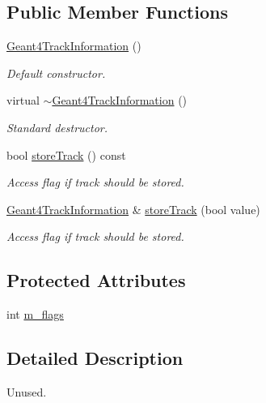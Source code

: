 \subsection*{Public Member Functions}
\begin{DoxyCompactItemize}
\item 
\hyperlink{class_d_d4hep_1_1_simulation_1_1_geant4_track_information_af654942e019813e21dd67c40cb964067}{Geant4\+Track\+Information} ()
\begin{DoxyCompactList}\small\item\em Default constructor. \end{DoxyCompactList}\item 
virtual \hyperlink{class_d_d4hep_1_1_simulation_1_1_geant4_track_information_a6867e8c464d4584ce8c3bb7f4041b504}{$\sim$\+Geant4\+Track\+Information} ()
\begin{DoxyCompactList}\small\item\em Standard destructor. \end{DoxyCompactList}\item 
bool \hyperlink{class_d_d4hep_1_1_simulation_1_1_geant4_track_information_ab1e007f0d526812b4353f81e4d64fa5c}{store\+Track} () const
\begin{DoxyCompactList}\small\item\em Access flag if track should be stored. \end{DoxyCompactList}\item 
\hyperlink{class_d_d4hep_1_1_simulation_1_1_geant4_track_information}{Geant4\+Track\+Information} \& \hyperlink{class_d_d4hep_1_1_simulation_1_1_geant4_track_information_a91857ec9a2cddd66aeac8e5de17cbe4a}{store\+Track} (bool value)
\begin{DoxyCompactList}\small\item\em Access flag if track should be stored. \end{DoxyCompactList}\end{DoxyCompactItemize}
\subsection*{Protected Attributes}
\begin{DoxyCompactItemize}
\item 
int \hyperlink{class_d_d4hep_1_1_simulation_1_1_geant4_track_information_ad1b4800b1848a07c234c8b6657a6c4f3}{m\+\_\+flags}
\end{DoxyCompactItemize}


\subsection{Detailed Description}
Unused. 

